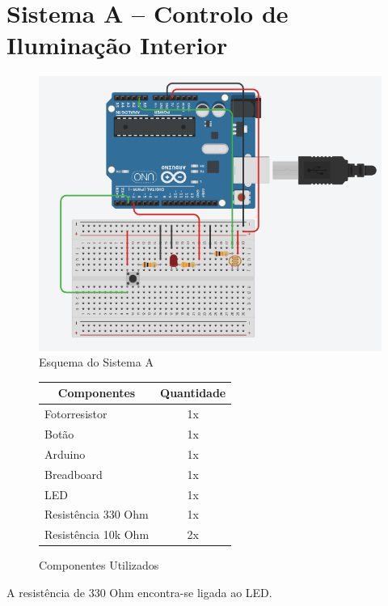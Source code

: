 \section{Sistema A – Controlo de Iluminação Interior}


\begin{figure}[H]
    \centering
    \includegraphics[scale=0.6]{images/hardware/sisA_tinkercad.png}
    \caption{Esquema do Sistema A}
\end{figure}

\begin{figure}[H]
\centering
\setlength{\arrayrulewidth}{0.5mm}
\renewcommand{\arraystretch}{1.5}
\begin{tabular}{|l | c|} 
 \hline
 \multicolumn{1}{|c|}{Componentes} & \multicolumn{1}{|c|}{Quantidade}\\ [0.8ex] 
 \hline
 Fotorresistor & 1x \\ 
 \hline
 Botão & 1x \\
 \hline
 Arduino & 1x \\
 \hline
 Breadboard & 1x\\
 \hline
 LED & 1x\\
 \hline
 Resistência 330 Ohm & 1x\\
 \hline
 Resistência 10k Ohm & 2x  \\
 \hline
\end{tabular}
\caption{Componentes Utilizados}
\end{figure}

A resistência de 330 Ohm encontra-se ligada ao LED.

